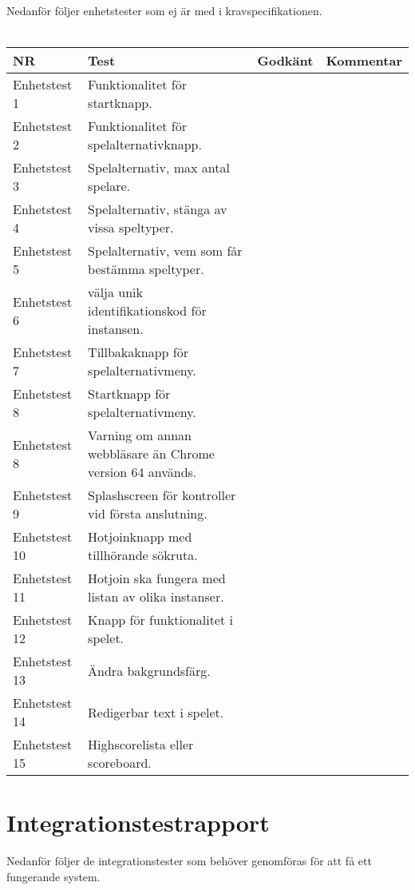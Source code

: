 \documentclass[10pt]{article}
\begin{document}
  \noindent Nedanför följer enhetstester som ej är med i kravspecifikationen.
\\ \\
\noindent
	\begin{tabular}{| p{2.1cm}|  p{5cm} | p{1.2cm}| p{7cm}|}
	
      \hline
      NR&Test&Godkänt&Kommentar\\
      \hline
    
		Enhetstest 1&Funktionalitet för startknapp.&&\\
		\hline
		Enhetstest 2&Funktionalitet för spelalternativknapp.&&\\
		\hline
		Enhetstest 3&Spelalternativ, max antal spelare.&&\\
		\hline
		Enhetstest 4&Spelalternativ, stänga av vissa speltyper.&&\\
		\hline
		Enhetstest 5&Spelalternativ, vem som får bestämma speltyper.&&\\
		\hline
		Enhetstest 6&välja unik identifikationskod för instansen.&&\\
		\hline
		Enhetstest 7&Tillbakaknapp för spelalternativmeny.&&\\
		\hline
		Enhetstest 8&Startknapp för spelalternativmeny.&&\\
		\hline
		Enhetstest 8&Varning om annan webbläsare än Chrome version 64 används.&&\\
		\hline
		Enhetstest 9&Splashscreen för kontroller vid första anslutning.&&\\
		\hline
		Enhetstest 10&Hotjoinknapp med tillhörande sökruta.&&\\
		\hline
		Enhetstest 11&Hotjoin ska fungera med listan av olika instanser.&&\\
		\hline
		Enhetstest 12&Knapp för funktionalitet i spelet.&&\\
		\hline
		Enhetstest 13&Ändra bakgrundsfärg.&&\\
		\hline
		Enhetstest 14&Redigerbar text i spelet.&&\\
		\hline
		Enhetstest 15&Highscorelista eller scoreboard.&&\\
		\hline



   
  \end{tabular}
  

\section{Integrationstestrapport}
Nedanför följer de integrationstester som behöver genomföras för att få ett fungerande system. \\
\\
\end{document}
